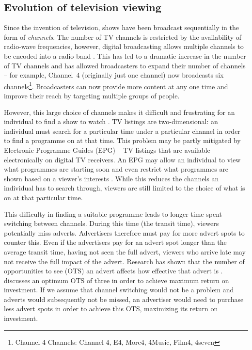 \subsection{Evolution of television viewing}
	\label{sec:evolution_of_TV}
	
	Since the invention of television, shows have been broadcast sequentially in the form of \textit{channels}. The number of TV channels is restricted by the availability of radio-wave frequencies, however, digital broadcasting allows multiple channels to be encoded into a radio band \citep{DTVTransmission}. This has led to a dramatic increase in the number of TV channels and has allowed broadcasters to expand their number of channels -- for example, Channel~4 (originally just one channel) now broadcasts six channels\footnote{Channel 4 Channels: Channel 4, E4, More4, 4Music, Film4, 4seven}. Broadcasters can now provide more content at any one time and improve their reach by targeting multiple groups of people.

	However, this large choice of channels makes it difficult and frustrating for an individual to find a show to watch \citep{cisco10Reasons}. TV listings are two-dimensional: an individual must search for a particular time under a particular channel in order to find a programme on at that time. This problem may be partly mitigated by Electronic Programme Guides (EPG) -- TV listings that are available electronically on digital TV receivers. An EPG may allow an individual to view what programmes are starting soon and even restrict what programmes are shown based on a viewer's interests \citep{informationOverload}. While this reduces the channels an individual has to search through, viewers are still limited to the choice of what is on at that particular time.

	This difficulty in finding a suitable programme leads to longer time spent switching between channels. During this time (the transit time), viewers potentially miss adverts. Advertisers therefore must pay for more advert spots to counter this. Even if the advertisers pay for an advert spot longer than the average transit time, having not seen the full advert, viewers who arrive late may not receive the full impact of the advert. Research has shown that the number of opportunities to see (OTS) an advert affects how effective that advert is \citep{OTS}. \citeauthor{OTS} discusses an optimum OTS of three in order to achieve maximum return on investment. If we assume that channel switching would not be a problem and adverts would subsequently not be missed, an advertiser would need to purchase less advert spots in order to achieve this OTS, maximizing its return on investment.

